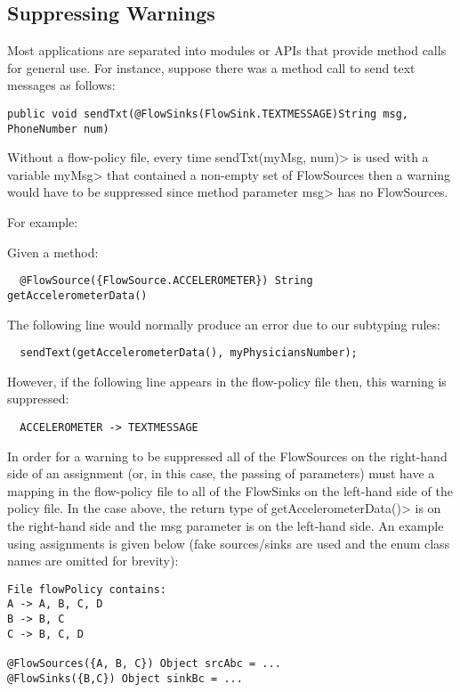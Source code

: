 \subsection{Suppressing Warnings}
Most applications are separated into modules or APIs that
provide method calls for general use.  For instance, suppose there
was a method call to send text messages as follows:
\begin{Verbatim}
public void sendTxt(@FlowSinks(FlowSink.TEXTMESSAGE)String msg, PhoneNumber num)
\end{Verbatim}

Without a flow-policy file, every time \<sendTxt(myMsg, num)> is
used with a variable \<myMsg> that contained a non-empty set of
FlowSources then a warning would have to be suppressed since method
parameter \<msg> has no FlowSources.

For example:

Given a method:
\begin{Verbatim}
  @FlowSource({FlowSource.ACCELEROMETER}) String getAccelerometerData()
\end{Verbatim}

The following line would normally produce an error due to our subtyping rules:
\begin{Verbatim}
  sendText(getAccelerometerData(), myPhysiciansNumber);
\end{Verbatim}

However, if the following line appears in the flow-policy file then, this warning is suppressed:
\begin{Verbatim}
  ACCELEROMETER -> TEXTMESSAGE
\end{Verbatim}

In order for a warning to be suppressed all of the FlowSources
on the right-hand side of an assignment (or, in this case, the
passing of parameters) must have a mapping in the flow-policy
file to all of the FlowSinks on the left-hand side of the policy
file.  In the case above, the return type of
\<getAccelerometerData()> is on the right-hand side and the
msg parameter is on the left-hand side.  An example using
assignments is given below  (fake sources/sinks are used and the
enum class names are omitted for brevity):

\begin{Verbatim}
File flowPolicy contains:
A -> A, B, C, D
B -> B, C
C -> B, C, D

@FlowSources({A, B, C}) Object srcAbc = ...
@FlowSinks({B,C}) Object sinkBc = ...
\end{Verbatim}


